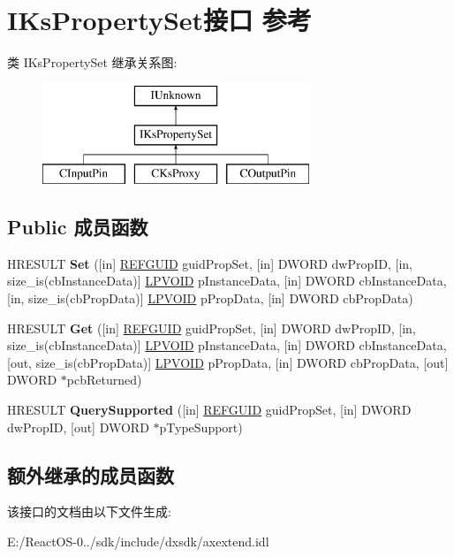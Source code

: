 \hypertarget{interface_i_ks_property_set}{}\section{I\+Ks\+Property\+Set接口 参考}
\label{interface_i_ks_property_set}
类 I\+Ks\+Property\+Set 继承关系图\+:\begin{figure}[H]
\begin{center}
\leavevmode
\includegraphics[height=3.000000cm]{interface_i_ks_property_set}
\end{center}
\end{figure}
\subsection*{Public 成员函数}
\begin{DoxyCompactItemize}
\item 
\mbox{\label{interface_i_ks_property_set_a16f9c7f049af939acfab0dc7400f4241}} 
H\+R\+E\+S\+U\+LT {\bfseries Set} (\mbox{[}in\mbox{]} \hyperlink{struct___g_u_i_d}{R\+E\+F\+G\+U\+ID} guid\+Prop\+Set, \mbox{[}in\mbox{]} D\+W\+O\+RD dw\+Prop\+ID, \mbox{[}in, size\+\_\+is(cb\+Instance\+Data)\mbox{]} \hyperlink{interfacevoid}{L\+P\+V\+O\+ID} p\+Instance\+Data, \mbox{[}in\mbox{]} D\+W\+O\+RD cb\+Instance\+Data, \mbox{[}in, size\+\_\+is(cb\+Prop\+Data)\mbox{]} \hyperlink{interfacevoid}{L\+P\+V\+O\+ID} p\+Prop\+Data, \mbox{[}in\mbox{]} D\+W\+O\+RD cb\+Prop\+Data)
\item 
\mbox{\label{interface_i_ks_property_set_aad4db9dc2d7d7224d28194f20397e028}} 
H\+R\+E\+S\+U\+LT {\bfseries Get} (\mbox{[}in\mbox{]} \hyperlink{struct___g_u_i_d}{R\+E\+F\+G\+U\+ID} guid\+Prop\+Set, \mbox{[}in\mbox{]} D\+W\+O\+RD dw\+Prop\+ID, \mbox{[}in, size\+\_\+is(cb\+Instance\+Data)\mbox{]} \hyperlink{interfacevoid}{L\+P\+V\+O\+ID} p\+Instance\+Data, \mbox{[}in\mbox{]} D\+W\+O\+RD cb\+Instance\+Data, \mbox{[}out, size\+\_\+is(cb\+Prop\+Data)\mbox{]} \hyperlink{interfacevoid}{L\+P\+V\+O\+ID} p\+Prop\+Data, \mbox{[}in\mbox{]} D\+W\+O\+RD cb\+Prop\+Data, \mbox{[}out\mbox{]} D\+W\+O\+RD $\ast$pcb\+Returned)
\item 
\mbox{\label{interface_i_ks_property_set_ac8ad2879977568e012a0ec4d7f32d406}} 
H\+R\+E\+S\+U\+LT {\bfseries Query\+Supported} (\mbox{[}in\mbox{]} \hyperlink{struct___g_u_i_d}{R\+E\+F\+G\+U\+ID} guid\+Prop\+Set, \mbox{[}in\mbox{]} D\+W\+O\+RD dw\+Prop\+ID, \mbox{[}out\mbox{]} D\+W\+O\+RD $\ast$p\+Type\+Support)
\end{DoxyCompactItemize}
\subsection*{额外继承的成员函数}


该接口的文档由以下文件生成\+:\begin{DoxyCompactItemize}
\item 
E\+:/\+React\+O\+S-\/0../sdk/include/dxsdk/axextend.\+idl\end{DoxyCompactItemize}
